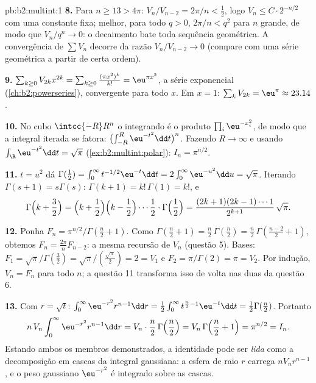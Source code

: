 \begin{solution}{pb:b2:multint:1}
\textbf{8.} Para $n \geq 13 > 4\pi$: $V_n/V_{n-2} = 2\pi/n <
\tfrac12$, logo $V_{n} \leq C\cdot 2^{-n/2}$ com uma
constante fixa; melhor, para todo $q > 0$, $2\pi/n < q^2$ para $n$ grande,
de modo que $V_n/q^n \to 0$: o decaimento bate toda sequência
geométrica. A convergência de $\sum V_n$ decorre da razão
$V_n/V_{n-2} \to 0$ (compare com uma série geométrica a
partir de certa ordem).

\textbf{9.} $\sum_{k\geq0}V_{2k}x^{2k} =
\sum_{k\geq0}\frac{(\pi x^2)^k}{k!} = \eu^{\pi x^2}$, a
série exponencial (\cref{ch:b2:powerseries}), convergente para
todo $x$. Em $x = 1$: $\sum_kV_{2k} = \eu^\pi \approx
23.14$.

\textbf{10.} No cubo $\intcc{-R}R^n$ o integrando é o
produto $\prod_i\eu^{-x_i^2}$, de modo que a integral iterada
se fatora: $\bigl(\int_{-R}^R\eu^{-t^2}\dd t\bigr)^n$.
Fazendo $R \to \infty$ e usando
$\int_\R\eu^{-t^2}\dd t = \sqrt\pi$
(\cref{ex:b2:multint:polar}): $I_n = \pi^{n/2}$.

\textbf{11.} $t = u^2$ dá $\Gamma(\tfrac12) =
\int_0^\infty t^{-1/2}\eu^{-t}\dd t =
2\int_0^\infty\eu^{-u^2}\dd u = \sqrt\pi$. Iterando
$\Gamma(s+1) = s\Gamma(s)$: $\Gamma(k+1) = k!\,\Gamma(1) =
k!$, e
\[
\Gamma\Bigl(k + \frac32\Bigr)
= \Bigl(k + \frac12\Bigr)\Bigl(k - \frac12\Bigr)\cdots
\frac12\cdot\Gamma\Bigl(\frac12\Bigr)
= \frac{(2k+1)(2k-1)\cdots1}{2^{k+1}}\,\sqrt\pi .
\]

\textbf{12.} Ponha $F_n = \pi^{n/2}/\Gamma(\frac n2 + 1)$.
Como $\Gamma(\frac n2 + 1) = \frac n2\,\Gamma(\frac n2) =
\frac n2\,\Gamma(\frac{n-2}2 + 1)$, obtemos $F_n =
\frac{2\pi}nF_{n-2}$: a mesma recursão de $V_n$ (questão
5). Bases: $F_1 = \sqrt\pi/\Gamma(\frac32) =
\sqrt\pi/(\frac{\sqrt\pi}2) = 2 = V_1$ e $F_2 =
\pi/\Gamma(2) = \pi = V_2$. Por indução, $V_n = F_n$ para todo
$n$; a questão 11 transforma isso de volta nas duas  da
questão 6.

\textbf{13.} Com $r = \sqrt t$: $\int_0^\infty
\eu^{-r^2}r^{n-1}\dd r = \frac12\int_0^\infty
t^{\frac n2 - 1}\eu^{-t}\dd t = \frac12\Gamma(\frac n2)$.
Portanto
\[
n\,V_n\int_0^\infty\eu^{-r^2}r^{n-1}\dd r
= V_n\cdot\frac n2\,\Gamma\Bigl(\frac n2\Bigr)
= V_n\,\Gamma\Bigl(\frac n2 + 1\Bigr) = \pi^{n/2} = I_n .
\]
Estando ambos os membros demonstrados, a identidade pode ser \emph{lida} como
a decomposição em cascas da integral gaussiana: a esfera
de raio $r$ carrega  $nV_nr^{n-1}$, e o peso
gaussiano $\eu^{-r^2}$ é integrado sobre as cascas.


\end{solution}
